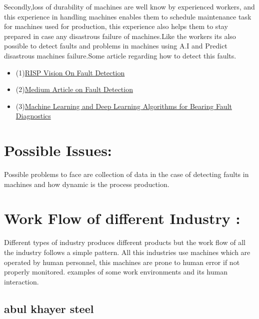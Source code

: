 \documentclass{article}
\begin{document}
\begin{normalsize}
      Secondly,loss of durability of machines are well know by experienced workers, and this experience in handling machines enables them to schedule maintenance task for machines used for production, this experience also helps them to stay prepared in case any disastrous failure of machines.Like the workers its also possible to detect faults and problems in machines using A.I and Predict disastrous machines failure.Some article regarding how to detect this faults.
        
        \begin{itemize}
        
\item(1)\href{https://www.rsipvision.com/machine-fault-detection-and-classification/}{RISP Vision On Fault Detection} 
\item(2)\href{https://medium.com/bigdatarepublic/machine-learning-for-predictive-maintenance-where-to-start-5f3b7586acfb}{Medium Article on Fault Detection} 
\item(3)\href{https://arxiv.org/pdf/1901.08247.pdf}{Machine Learning and Deep Learning
Algorithms for Bearing Fault Diagnostics}

        \end{itemize}
        
    	\section{Possible Issues:}
        Possible problems to face are collection of data in the case of detecting faults in machines and how dynamic is the process production.
        \section{Work Flow of different Industry  :}
        Different types of industry produces different products but the work flow of all the industry follows a simple pattern. All this industries use machines which are operated by human personnel, this machines are prone to human error if not properly monitored. examples of some work environments and its human interaction.
        \subsection{abul khayer steel}
        \begin{tikzpicture}[node distance = 2cm]
        	

\end{tikzpicture}
\end{normalsize}
\end{document}

